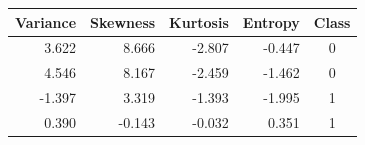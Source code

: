 \begin{tabular}{rrrrc}
\toprule
Variance & Skewness & Kurtosis & Entropy & Class \\
\midrule
3.622 & 8.666 & -2.807 & -0.447 & 0 \\
4.546 & 8.167 & -2.459 & -1.462 & 0 \\
-1.397 & 3.319 & -1.393 & -1.995 & 1 \\
0.390 & -0.143 & -0.032 & 0.351 & 1 \\
\bottomrule
\end{tabular}
